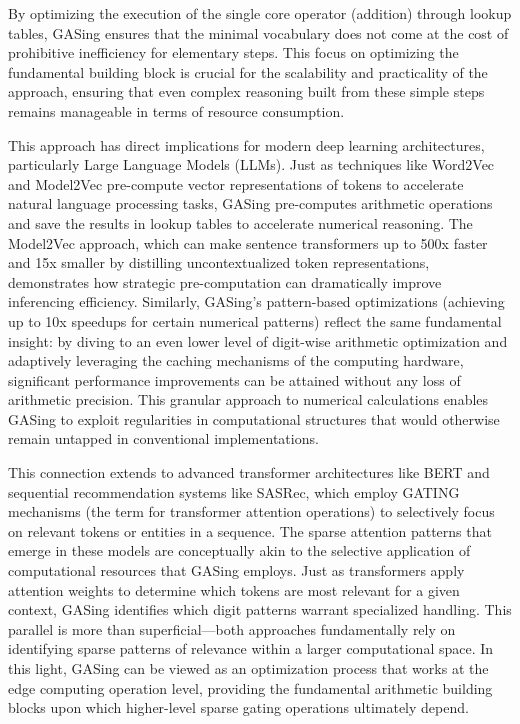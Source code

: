 By optimizing the execution of the single core operator (addition) through lookup tables, GASing ensures that the minimal vocabulary does not come at the cost of prohibitive inefficiency for elementary steps. This focus on optimizing the fundamental building block is crucial for the scalability and practicality of the approach, ensuring that even complex reasoning built from these simple steps remains manageable in terms of resource consumption.

This approach has direct implications for modern deep learning architectures, particularly Large Language Models (LLMs). Just as techniques like Word2Vec and Model2Vec pre-compute vector representations of tokens to accelerate natural language processing tasks, GASing pre-computes arithmetic operations and save the results in lookup tables to accelerate numerical reasoning. The Model2Vec approach, which can make sentence transformers up to 500x faster and 15x smaller by distilling uncontextualized token representations, demonstrates how strategic pre-computation can dramatically improve inferencing efficiency. Similarly, GASing's pattern-based optimizations (achieving up to 10x speedups for certain numerical patterns) reflect the same fundamental insight: by diving to an even lower level of digit-wise arithmetic optimization and adaptively leveraging the caching mechanisms of the computing hardware, significant performance improvements can be attained without any loss of arithmetic precision. This granular approach to numerical calculations enables GASing to exploit regularities in computational structures that would otherwise remain untapped in conventional implementations.

This connection extends to advanced transformer architectures like BERT and sequential recommendation systems like SASRec, which employ GATING mechanisms (the term for transformer attention operations) to selectively focus on relevant tokens or entities in a sequence. The sparse attention patterns that emerge in these models are conceptually akin to the selective application of computational resources that GASing employs. Just as transformers apply attention weights to determine which tokens are most relevant for a given context, GASing identifies which digit patterns warrant specialized handling. This parallel is more than superficial—both approaches fundamentally rely on identifying sparse patterns of relevance within a larger computational space. In this light, GASing can be viewed as an optimization process that works at the edge computing operation level, providing the fundamental arithmetic building blocks upon which higher-level sparse gating operations ultimately depend.

